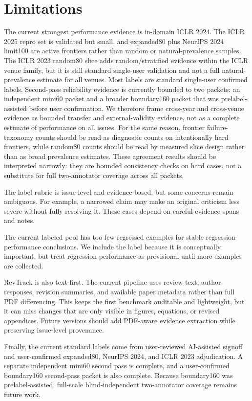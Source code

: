 \section{Limitations}

The current strongest performance evidence is in-domain ICLR 2024.
The ICLR 2025 repro set is validated but small, and expanded80 plus NeurIPS 2024 limit100 are active frontiers rather than random or natural-prevalence samples.
The ICLR 2023 random80 slice adds random/stratified evidence within the ICLR venue family, but it is still standard single-user validation and not a full natural-prevalence estimate for all venues.
Most labels are standard single-user confirmed labels.
Second-pass reliability evidence is currently bounded to two packets: an independent mini60 packet and a broader boundary160 packet that was prelabel-assisted before user confirmation.
We therefore frame cross-year and cross-venue evidence as bounded transfer and external-validity evidence, not as a complete estimate of performance on all issues.
For the same reason, frontier failure-taxonomy counts should be read as diagnostic counts on intentionally hard frontiers, while random80 counts should be read by measured slice design rather than as broad prevalence estimates.
These agreement results should be interpreted narrowly: they are bounded consistency checks on hard cases, not a substitute for full two-annotator coverage across all packets.

The label rubric is issue-level and evidence-based, but some concerns remain ambiguous.
For example, a narrowed claim may make an original criticism less severe without fully resolving it.
These cases depend on careful evidence spans and notes.

The current labeled pool has too few regressed examples for stable regression-performance conclusions.
We include the label because it is conceptually important, but treat regression performance as provisional until more examples are collected.

RevTrack is also text-first.
The current pipeline uses review text, author responses, revision summaries, and available paper metadata rather than full PDF differencing.
This keeps the first benchmark auditable and lightweight, but it can miss changes that are only visible in figures, equations, or revised appendices.
Future versions should add PDF-aware evidence extraction while preserving issue-level provenance.

Finally, the current standard labels come from user-reviewed AI-assisted signoff and user-confirmed expanded80, NeurIPS 2024, and ICLR 2023 adjudication.
A separate independent mini60 second pass is complete, and a user-confirmed boundary160 second-pass packet is also complete.
Because boundary160 was prelabel-assisted, full-scale blind-independent two-annotator coverage remains future work.
